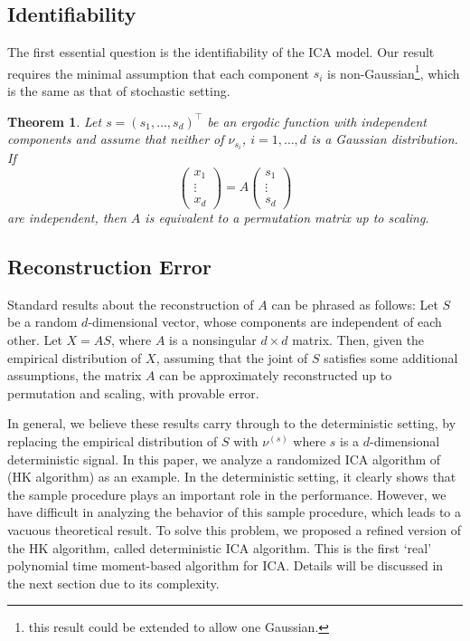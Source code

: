 \documentclass[twoside]{article}
\newcommand{\xcom}[1]{x_{#1}}
\newcommand{\scom}[1]{s_{#1}}
\newtheorem{thm}[lemma]{Theorem}
\theoremstyle{definition}
\begin{document}
\subsection{Identifiability}
\label{subsec:Indentifiability}
The first essential question is the identifiability of the ICA model.
Our result requires the minimal assumption that each component $s_i$ is non-Gaussian\footnote{this result could be extended to allow one Gaussian.}, which is the same as that of stochastic setting.
\begin{thm}
\label{thm:CorofICA}
Let $s = (\scom{1},\ldots,\scom{d})^{\top}$ be an ergodic function with independent components and
assume that neither of $\nu_{\scom{i}}$, $i=1,\ldots,d$ is a Gaussian distribution. If
\begin{equation}
\left(
\begin{array}{ccc}
\xcom{1} \\
\vdots \\
\xcom{d}
\end{array}
\right) = A
\left(
\begin{array}{ccc}
\scom{1} \\
\vdots \\
\scom{d}
\end{array}
\right)
\end{equation}
are independent, then $A$ is equivalent to a permutation matrix up to scaling.
\end{thm}

\subsection{Reconstruction Error}
\label{subsec:HowDifficult}

Standard results about the reconstruction of $A$ can be phrased as follows:
Let $S$ be a random $d$-dimensional vector, whose components are independent of each other.
Let $X = A S$, where $A$ is a nonsingular $d\times d$ matrix. Then, given the empirical distribution of $X$, assuming that the joint of $S$ satisfies some additional assumptions, the matrix $A$ can be approximately reconstructed up to permutation and scaling, with provable error.

In general, we believe these results carry through to the deterministic setting, by replacing the empirical distribution of $S$ with $\nu^{(s)}$ where $s$ is a $d$-dimensional deterministic signal.
In this paper, we analyze a randomized ICA algorithm of \citep{DHsu2012}(HK algorithm) as an example. 
In the deterministic setting, it clearly shows that the sample procedure plays an important role in the performance.
However, we have difficult in analyzing the behavior of this sample procedure, which leads to a vacuous theoretical result.
To solve this problem, we proposed a refined version of the HK algorithm, called deterministic ICA algorithm. 
This is the first `real' polynomial time moment-based algorithm for ICA. 
Details will be discussed in the next section due to its complexity.  
\end{document}
